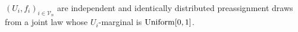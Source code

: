 \((U_i,f_i)_{i\in\mathcal V_n}\) are independent and identically distributed preassignment draws from a joint law whose \(U_i\)-marginal is \({\rm Uniform}[0,1]\).